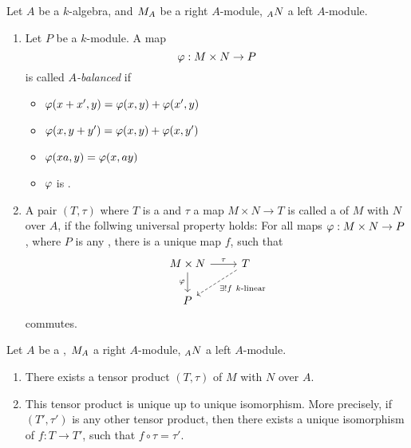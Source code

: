 \begin{defn}
  Let $A$ be a $k$-algebra, and $\indmodule{M}[A]$ be a right $A$-module, $\indmodule[A]{N}$ a left $A$-module.
  \begin{enumerate}
    \item Let $P$ be a $k$-module. A map
    \[
    \varphi: M\times N\to P
    \]
    is called \emph{$A$-balanced}  if
    \begin{itemize}
      \item $\varphi(x+x',y)=\varphi(x,y)+\varphi(x',y)$
      \item $\varphi(x,y+y')=\varphi(x,y)+\varphi(x,y')$
      \item $\varphi(xa,y)=\varphi(x,ay)$
      \item $\varphi$ is .
    \end{itemize}
  \item A pair $(T,\tau)$ where $T$ is a  and $\tau$ a  map $M\times N\to T$ is called a  of $M$ with $N$ over $A$, if the follwing universal property holds: For all  maps $\varphi:M\times N\to P$, where $P$ is any , there is a unique  map $f$, such that
  \[
  \begin{tikzcd}
    M\times N\ar{r}{\tau}\ar[swap]{d}{\pphi}&T\ar[dashed]{dl}{\exists!f~k\text{-linear}}\\
    P&
  \end{tikzcd}
  \]
  commutes.
\end{enumerate}
\end{defn}

\begin{lem}
  Let $A$ be a , $\indmodule{M}[A]$ a right $A$-module, $\indmodule[A]{N}$ a left $A$-module.
  \begin{enumerate}
    \item There exists a tensor product $(T,\tau)$ of $M$ with $N$ over $A$.
    \item This tensor product is unique up to unique isomorphism. More precisely, if $(T',\tau')$ is any other tensor product, then there exists a unique isomorphism of  $f:T\to T'$, such that $f\circ \tau = \tau'$.
  \end{enumerate}
\end{lem}

